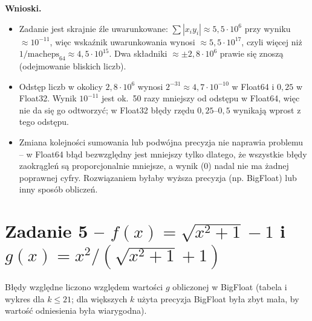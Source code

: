 \documentclass[11pt,a4paper]{article}
\begin{document}
\textbf{Wnioski.}
\begin{itemize}
\item Zadanie jest skrajnie źle uwarunkowane: $\sum|x_iy_i|\approx5{,}5\cdot10^{6}$ przy wyniku $\approx10^{-11}$, więc wskaźnik uwarunkowania wynosi $\approx5{,}5\cdot10^{17}$, czyli więcej niż $1/\text{macheps}_{64}\approx4{,}5\cdot10^{15}$. Dwa składniki $\approx\pm2{,}8\cdot10^{6}$ prawie się znoszą (odejmowanie bliskich liczb).
\item Odstęp liczb w okolicy $2{,}8\cdot10^{6}$ wynosi $2^{-31}\approx4{,}7\cdot10^{-10}$ w Float64 i $0{,}25$ w Float32. Wynik $10^{-11}$ jest ok.\ 50 razy mniejszy od odstępu w Float64, więc nie da się go odtworzyć; w Float32 błędy rzędu $0{,}25$--$0{,}5$ wynikają wprost z tego odstępu.
\item Zmiana kolejności sumowania lub podwójna precyzja nie naprawia problemu -- w Float64 błąd bezwzględny jest mniejszy tylko dlatego, że wszystkie błędy zaokrągleń są proporcjonalnie mniejsze, a wynik (0) nadal nie ma żadnej poprawnej cyfry. Rozwiązaniem byłaby wyższa precyzja (np. BigFloat) lub inny sposób obliczeń.
\end{itemize}

\section{Zadanie 5 -- $f(x)=\sqrt{x^2+1}-1$ i $g(x)=x^2/(\sqrt{x^2+1}+1)$}

Błędy względne liczono względem wartości $g$ obliczonej w BigFloat (tabela i wykres dla $k\le21$; dla większych $k$ użyta precyzja BigFloat była zbyt mała, by wartość odniesienia była wiarygodna).
\end{document}
